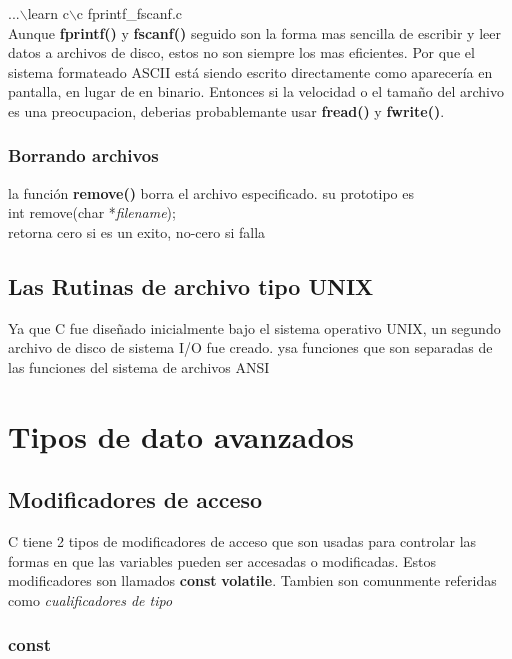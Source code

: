\documentclass[]{article}
\begin{document}
	...$\backslash$learn c$\backslash$c fprintf\_fscanf.c\\
	
	Aunque \textbf{fprintf()} y \textbf{fscanf()} seguido son la forma mas sencilla de escribir y leer datos a archivos de disco, estos no son siempre los mas eficientes. Por que el sistema formateado ASCII está siendo escrito directamente como aparecería en pantalla, en lugar de en binario. Entonces si la velocidad o el tamaño del archivo es una preocupacion, deberias probablemante usar \textbf{fread()} y \textbf{fwrite()}.
	
	\subsubsection{Borrando archivos}
	
	la función \textbf{remove()} borra el archivo especificado. su prototipo es\\
	
	int remove(char *\textit{filename});\\
	
	retorna cero si es un exito, no-cero si falla
	
	\subsection{Las Rutinas de archivo tipo UNIX}
	
	Ya que C fue diseñado inicialmente bajo el sistema operativo UNIX, un segundo archivo de disco de sistema I/O fue creado. ysa funciones que son separadas de las funciones del sistema de archivos ANSI
	
	\section{Tipos de dato avanzados}
	
	\subsection{Modificadores de acceso}
	
	C tiene 2 tipos de modificadores de acceso que son usadas para controlar las formas en que las variables pueden ser accesadas o modificadas. Estos modificadores son llamados \textbf{const} \textbf{volatile}. Tambien son comunmente referidas como \textit{cualificadores de tipo}
	
	\subsubsection{const}
	
\end{document}
